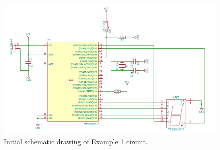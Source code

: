 \documentclass[12pt,letterpaper]{scrartcl}
\begin{document}
\begin{enumerate}
		\begin{figure}[h]
			\centering
			\includegraphics{example1-schematic-1}
			\caption{Initial schematic drawing of Example 1 circuit.}
			\label{fig:example1-schematic-1}
		\end{figure}
	

\end{enumerate}
\end{document}
